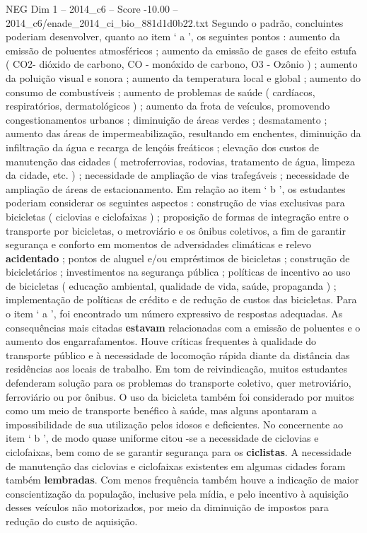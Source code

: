 \begin{textsample}{NEG Dim 1 – 2014\_c6 – Score -10.00 – 2014\_c6/enade\_2014\_ci\_bio\_881d1d0b22.txt}
Segundo o padrão, concluintes poderiam desenvolver, quanto ao item ‘ a ’, os seguintes pontos : aumento da emissão de poluentes atmosféricos ; aumento da emissão de gases de efeito estufa ( CO2- dióxido de carbono, CO - monóxido de carbono, O3 - Ozônio ) ; aumento da poluição visual e sonora ; aumento da temperatura local e global ; aumento do consumo de combustíveis ; aumento de problemas de saúde ( cardíacos, respiratórios, dermatológicos ) ; aumento da frota de veículos, promovendo congestionamentos urbanos ; diminuição de áreas verdes ; desmatamento ; aumento das áreas de impermeabilização, resultando em enchentes, diminuição da infiltração da água e recarga de lençóis freáticos ; elevação dos custos de manutenção das cidades ( metroferrovias, rodovias, tratamento de água, limpeza da cidade, etc. ) ; necessidade de ampliação de vias trafegáveis ; necessidade de ampliação de áreas de estacionamento.
Em relação ao item ‘ b ’, os estudantes poderiam considerar os seguintes aspectos : construção de vias exclusivas para bicicletas ( ciclovias e ciclofaixas ) ; proposição de formas de integração entre o transporte por bicicletas, o metroviário e os ônibus coletivos, a fim de garantir segurança e conforto em momentos de adversidades climáticas e relevo \textbf{acidentado} ; pontos de aluguel e/ou empréstimos de bicicletas ; construção de bicicletários ; investimentos na segurança pública ; políticas de incentivo ao uso de bicicletas ( educação ambiental, qualidade de vida, saúde, propaganda ) ; implementação de políticas de crédito e de redução de custos das bicicletas.
Para o item ‘ a ’, foi encontrado um número expressivo de respostas adequadas.
As consequências mais citadas \textbf{estavam} relacionadas com a emissão de poluentes e o aumento dos engarrafamentos.
Houve críticas frequentes à qualidade do transporte público e à necessidade de locomoção rápida diante da distância das residências aos locais de trabalho.
Em tom de reivindicação, muitos estudantes defenderam solução para os problemas do transporte coletivo, quer metroviário, ferroviário ou por ônibus.
O uso da bicicleta também foi considerado por muitos como um meio de transporte benéfico à saúde, mas alguns apontaram a impossibilidade de sua utilização pelos idosos e deficientes.
No concernente ao item ‘ b ’, de modo quase uniforme citou -se a necessidade de ciclovias e ciclofaixas, bem como de se garantir segurança para os \textbf{ciclistas}.
A necessidade de manutenção das ciclovias e ciclofaixas existentes em algumas cidades foram também \textbf{lembradas}.
Com menos frequência também houve a indicação de maior conscientização da população, inclusive pela mídia, e pelo incentivo à aquisição desses veículos não motorizados, por meio da diminuição de impostos para redução do custo de aquisição.

\end{textsample}
